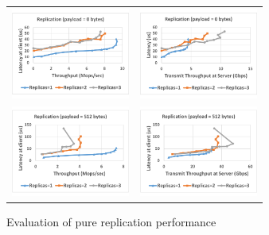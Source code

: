 \documentclass[10pt, preprint]{sigplanconf}
\begin{document}
\begin{figure}
\begin{tabular}{cc}
\begin{minipage}{0.25\textwidth}
  \hspace{-0.17in}
  \includegraphics[width=\textwidth,height=3cm]{results/replication_mops_0.pdf}
\end{minipage}&
\begin{minipage}{0.25\textwidth}
  \hspace{-0.37in}
  \includegraphics[width=\textwidth,height=3cm]{results/replication_gbps_0.pdf}
\end{minipage}\\
\begin{minipage}{0.25\textwidth}
  \hspace{-0.17in}
  \includegraphics[width=\textwidth,height=3cm]{results/replication_mops_512.pdf}
\end{minipage}&
\begin{minipage}{0.25\textwidth}
  \hspace{-0.37in}
  \includegraphics[width=\textwidth,height=3cm]{results/replication_gbps_512.pdf}
\end{minipage}
\end{tabular}
\caption{Evaluation of pure replication performance}
\label{fig:pure_rep}
\end{figure}
\end{document}
